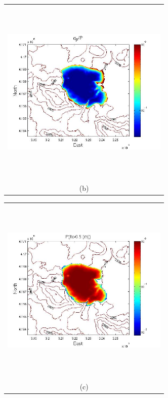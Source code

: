 \documentclass{article}
\newcommand{\Pic}[2][0.85]{\begin{center}\texttt{[image: \#2]}
 \end{center} }
\begin{document}
\begin{figure}[H]
\begin{minipage}{0.6\textwidth}
\begin{tabular}{c}
	\includegraphics[width=8cm,height=9cm,keepaspectratio]{figs/Mammoth_0_sigma_5m.jpg}\\
        (b)
        \end{tabular}
    \end{minipage} 
        \begin{minipage}[b]{0.6\textwidth}
        \begin{tabular}{c}
       \includegraphics[width=8cm,height=9cm,keepaspectratio]{figs/Mammoth_3_P_5m.jpg}\\
        (c)
        \end{tabular}
    \end{minipage}
    \begin{minipage}{0.6\textwidth}
        \begin{tabular}{c}

\end{tabular}
\end{minipage}
\end{figure}
\end{document}
